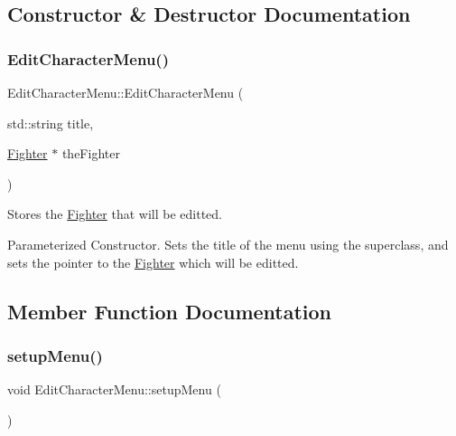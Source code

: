 \subsection{Constructor \& Destructor Documentation}
\hypertarget{class_edit_character_menu_ac5ccf5f076cb527b6a2b37d3354dfbcb}{}\label{class_edit_character_menu_ac5ccf5f076cb527b6a2b37d3354dfbcb} 
\subsubsection{\texorpdfstring{Edit\+Character\+Menu()}{EditCharacterMenu()}}
{\footnotesize\ttfamily Edit\+Character\+Menu\+::\+Edit\+Character\+Menu (\begin{DoxyParamCaption}\item[{std\+::string}]{title,  }\item[{\hyperlink{class_fighter}{Fighter} $\ast$}]{the\+Fighter }\end{DoxyParamCaption})}



Stores the \hyperlink{class_fighter}{Fighter} that will be editted. 

Parameterized Constructor. Sets the title of the menu using the superclass, and sets the pointer to the \hyperlink{class_fighter}{Fighter} which will be editted. 

\subsection{Member Function Documentation}
\hypertarget{class_edit_character_menu_a2ea2e7296923486c5c1e83bd5e5e8c11}{}\label{class_edit_character_menu_a2ea2e7296923486c5c1e83bd5e5e8c11} 
\subsubsection{\texorpdfstring{setup\+Menu()}{setupMenu()}}
{\footnotesize\ttfamily void Edit\+Character\+Menu\+::setup\+Menu (\begin{DoxyParamCaption}{ }\end{DoxyParamCaption})\hspace{0.3cm}{\ttfamily [virtual]}}

